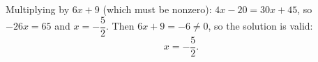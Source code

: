 Multiplying by $6x+9$ (which must be nonzero): $4x-20=30x+45$, so $-26x=65$ and $x=-\dfrac{5}{2}$. Then $6x+9=-6\ne0$, so the solution is valid:
\[\boxed{x=-\dfrac{5}{2}}.\]
